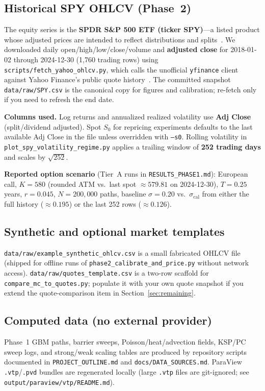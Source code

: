 \documentclass[11pt]{article}
\begin{document}
\subsection{Historical SPY OHLCV (Phase~2)}
The equity series is the \textbf{SPDR S\&P 500 ETF (ticker SPY)}---a listed product
whose adjusted prices are intended to reflect distributions and splits~\cite{spy-etf}.
We downloaded daily open/high/low/close/volume and \textbf{adjusted close} for
2018-01-02 through 2024-12-30 (1{,}760 trading rows) using
\texttt{scripts/fetch\_yahoo\_ohlcv.py}, which calls the unofficial
\texttt{yfinance} client~\cite{yfinance} against Yahoo Finance's public quote
history~\cite{yahoofinance}. The committed snapshot \texttt{data/raw/SPY.csv} is the
canonical copy for figures and calibration; re-fetch only if you need to refresh the
end date.

\textbf{Columns used.} Log returns and annualized realized volatility use
\textbf{Adj Close} (split/dividend adjusted). Spot $S_0$ for repricing experiments
defaults to the last available Adj Close in the file unless overridden with
\texttt{--s0}. Rolling volatility in
\texttt{plot\_spy\_volatility\_regime.py} applies a trailing window of
\textbf{252 trading days} and scales by $\sqrt{252}$.

\textbf{Reported option scenario} (Tier~A runs in \texttt{RESULTS\_PHASE1.md}):
European call, $K{=}580$ (rounded ATM vs.\ last spot $\approx 579.81$ on 2024-12-30),
$T{=}0.25$ years, $r{=}0.045$, $N{=}200{,}000$ paths, baseline $\sigma{=}0.20$ vs.\
$\sigma_{\mathrm{cal}}$ from either the full history ($\approx 0.195$) or the last
252 rows ($\approx 0.126$).

\subsection{Synthetic and optional market templates}
\texttt{data/raw/example\_synthetic\_ohlcv.csv} is a small fabricated OHLCV file
(shipped for offline runs of \texttt{phase2\_calibrate\_and\_price.py} without
network access). \texttt{data/raw/quotes\_template.csv} is a two-row scaffold for
\texttt{compare\_mc\_to\_quotes.py}; populate it with your own quote snapshot if you
extend the quote-comparison item in Section~\ref{sec:remaining}.

\subsection{Computed data (no external provider)}
Phase~1 GBM paths, barrier sweeps, Poisson/heat/advection fields, KSP/PC sweep logs,
and strong/weak scaling tables are produced by repository scripts documented in
\texttt{PROJECT\_OUTLINE.md} and \texttt{docs/DATA\_SOURCES.md}. ParaView
\texttt{.vtp}/\texttt{.pvd} bundles are regenerated locally (large \texttt{.vtp}
files are git-ignored; see \texttt{output/paraview/vtp/README.md}).
\end{document}
